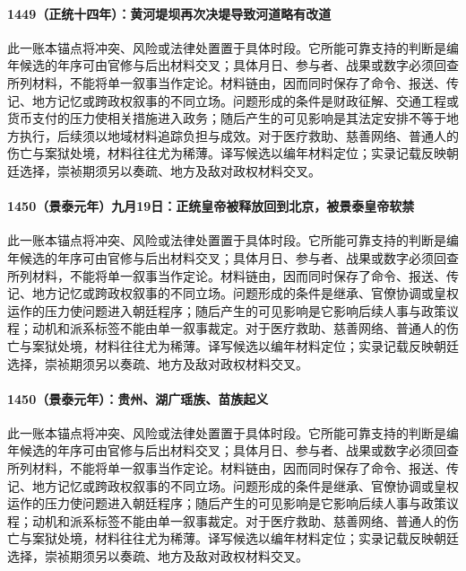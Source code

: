 \paragraph{1449（正统十四年）：黄河堤坝再次决堤导致河道略有改道} 此一账本锚点将冲突、风险或法律处置置于具体时段。它所能可靠支持的判断是编年候选的年序可由官修与后出材料交叉；具体月日、参与者、战果或数字必须回查所列材料，不能将单一叙事当作定论。材料链由，因而同时保存了命令、报送、传记、地方记忆或跨政权叙事的不同立场。问题形成的条件是财政征解、交通工程或货币支付的压力使相关措施进入政务；随后产生的可见影响是其法定安排不等于地方执行，后续须以地域材料追踪负担与成效。对于医疗救助、慈善网络、普通人的伤亡与案狱处境，材料往往尤为稀薄。译写候选以编年材料定位；实录记载反映朝廷选择，崇祯期须另以奏疏、地方及敌对政权材料交叉。

\paragraph{1450（景泰元年）九月19日：正统皇帝被释放回到北京，被景泰皇帝软禁} 此一账本锚点将冲突、风险或法律处置置于具体时段。它所能可靠支持的判断是编年候选的年序可由官修与后出材料交叉；具体月日、参与者、战果或数字必须回查所列材料，不能将单一叙事当作定论。材料链由，因而同时保存了命令、报送、传记、地方记忆或跨政权叙事的不同立场。问题形成的条件是继承、官僚协调或皇权运作的压力使问题进入朝廷程序；随后产生的可见影响是它影响后续人事与政策议程；动机和派系标签不能由单一叙事裁定。对于医疗救助、慈善网络、普通人的伤亡与案狱处境，材料往往尤为稀薄。译写候选以编年材料定位；实录记载反映朝廷选择，崇祯期须另以奏疏、地方及敌对政权材料交叉。

\paragraph{1450（景泰元年）：贵州、湖广瑶族、苗族起义} 此一账本锚点将冲突、风险或法律处置置于具体时段。它所能可靠支持的判断是编年候选的年序可由官修与后出材料交叉；具体月日、参与者、战果或数字必须回查所列材料，不能将单一叙事当作定论。材料链由，因而同时保存了命令、报送、传记、地方记忆或跨政权叙事的不同立场。问题形成的条件是继承、官僚协调或皇权运作的压力使问题进入朝廷程序；随后产生的可见影响是它影响后续人事与政策议程；动机和派系标签不能由单一叙事裁定。对于医疗救助、慈善网络、普通人的伤亡与案狱处境，材料往往尤为稀薄。译写候选以编年材料定位；实录记载反映朝廷选择，崇祯期须另以奏疏、地方及敌对政权材料交叉。
